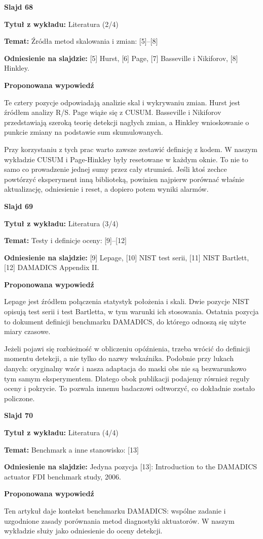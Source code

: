 \documentclass[a4paper,11pt]{article}
\newcommand{\NumerSlajdu}{1}
\newcommand{\Komentarz}[3]{%
  \gdef\NumerSlajdu{#1}%
  {\Large\bfseries Slajd #1\par}\smallskip
  \textbf{Tytuł z wykładu:} #2\par
  \textbf{Temat:} #3\par\medskip
}
\begin{document}
\Komentarz{68}{Literatura (2/4)}{Źródła metod skalowania i zmian: [5]–[8]}
{\small\color{black!65}\textbf{Odniesienie na slajdzie:} [5] Hurst, [6] Page, [7] Basseville i Nikiforov, [8] Hinkley.\par}
\medskip
\textbf{Proponowana wypowiedź}\par
Te cztery pozycje odpowiadają analizie skal i wykrywaniu zmian. Hurst jest źródłem analizy R/S. Page wiąże się z CUSUM. Basseville i Nikiforov przedstawiają szeroką teorię detekcji nagłych zmian, a Hinkley wnioskowanie o punkcie zmiany na podstawie sum skumulowanych.

Przy korzystaniu z tych prac warto zawsze zestawić definicję z kodem. W naszym wykładzie CUSUM i Page-Hinkley były resetowane w każdym oknie. To nie to samo co prowadzenie jednej sumy przez cały strumień. Jeśli ktoś zechce powtórzyć eksperyment inną biblioteką, powinien najpierw porównać właśnie aktualizację, odniesienie i reset, a dopiero potem wyniki alarmów.
\clearpage

\Komentarz{69}{Literatura (3/4)}{Testy i definicje oceny: [9]–[12]}
{\small\color{black!65}\textbf{Odniesienie na slajdzie:} [9] Lepage, [10] NIST test serii, [11] NIST Bartlett, [12] DAMADICS Appendix II.\par}
\medskip
\textbf{Proponowana wypowiedź}\par
Lepage jest źródłem połączenia statystyk położenia i skali. Dwie pozycje NIST opisują test serii i test Bartletta, w tym warunki ich stosowania. Ostatnia pozycja to dokument definicji benchmarku DAMADICS, do którego odnoszą się użyte miary czasowe.

Jeżeli pojawi się rozbieżność w obliczeniu opóźnienia, trzeba wrócić do definicji momentu detekcji, a nie tylko do nazwy wskaźnika. Podobnie przy lukach danych: oryginalny wzór i nasza adaptacja do maski obs nie są bezwarunkowo tym samym eksperymentem. Dlatego obok publikacji podajemy również reguły oceny i pokrycie. To pozwala innemu badaczowi odtworzyć, co dokładnie zostało policzone.
\clearpage

\Komentarz{70}{Literatura (4/4)}{Benchmark a inne stanowisko: [13]}
{\small\color{black!65}\textbf{Odniesienie na slajdzie:} Jedyna pozycja [13]: Introduction to the DAMADICS actuator FDI benchmark study, 2006.\par}
\medskip
\textbf{Proponowana wypowiedź}\par
Ten artykuł daje kontekst benchmarku DAMADICS: wspólne zadanie i uzgodnione zasady porównania metod diagnostyki aktuatorów. W naszym wykładzie służy jako odniesienie do oceny detekcji.
\end{document}
